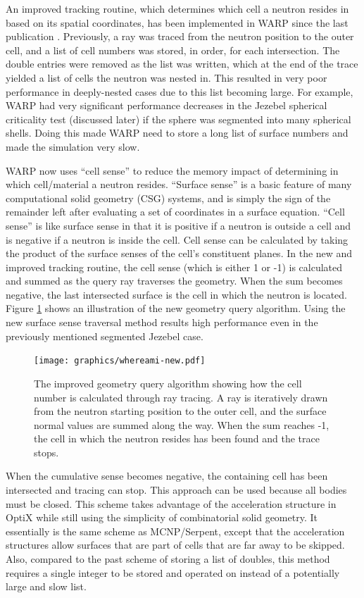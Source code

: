 \documentclass[preprint,12pt]{elsarticle}
\begin{document}
An improved tracking routine, which determines which cell a neutron resides in based on its spatial coordinates, has been implemented in WARP since the last publication \cite{algorithms}.  Previously, a ray was traced from the neutron position to the outer cell, and a list of cell numbers was stored, in order, for each intersection.  The double entries were removed as the list was written, which at the end of the trace yielded a list of cells the neutron was nested in.  This resulted in very poor performance in deeply-nested cases due to this list becoming large.  For example, WARP had very significant performance decreases in the Jezebel spherical criticality test (discussed later) if the sphere was segmented into many spherical shells.  Doing this made WARP need to store a long list of surface numbers and made the simulation very slow.  

WARP now uses ``cell sense'' to reduce the memory impact of determining in which cell/material a neutron resides.  ``Surface sense'' is a basic feature of many computational solid geometry (CSG) systems, and is simply the sign of the remainder left after evaluating a set of coordinates in a surface equation. ``Cell sense'' is like surface sense in that it is positive if a neutron is outside a cell and is negative if a neutron is inside the cell.  Cell sense can be calculated by taking the product of the surface senses of the cell's constituent planes.  In the new and improved tracking routine, the cell sense (which is either 1 or -1) is calculated and summed as the query ray traverses the geometry.  When the sum becomes negative, the last intersected surface is the cell in which the neutron is located.   Figure \ref{whereami} shows an illustration of the new geometry query algorithm.  Using the new surface sense traversal method results high performance even in the previously mentioned segmented Jezebel case.

\begin{figure}[h!]
\centering
\texttt{[image: graphics/whereami-new.pdf]}
\caption{The improved geometry query algorithm showing how the cell number is calculated through ray tracing.  A ray is iteratively drawn from the neutron starting position to the outer cell, and the surface normal values are summed along the way.  When the sum reaches -1, the cell in which the neutron resides has been found and the trace stops. \label{whereami} }
\end{figure}

 When the cumulative sense becomes negative, the containing cell has been intersected and tracing can stop.  This approach can be used because all bodies must be closed.  This scheme takes advantage of the acceleration structure in OptiX while still using the simplicity of combinatorial solid geometry.  It essentially is the same scheme as MCNP/Serpent, except that the acceleration structures allow surfaces that are part of cells that are far away to be skipped.  Also, compared to the past scheme of storing a list of doubles, this method requires a single integer to be stored and operated on instead of a potentially large and slow list. 
\end{document}
